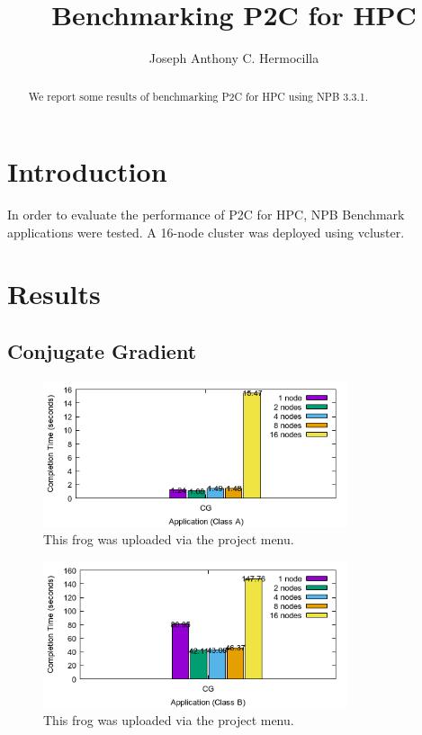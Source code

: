 \documentclass[a4paper]{article}
\title{Benchmarking P2C for HPC}
\author{Joseph Anthony C. Hermocilla}
\begin{document}
\maketitle

\begin{abstract}
We report some results of benchmarking P2C for HPC using NPB 3.3.1.
\end{abstract}

\section{Introduction}
In order to evaluate the performance of P2C for HPC, NPB Benchmark applications were tested. A 16-node cluster was deployed using vcluster.

\section{Results}

\subsection{Conjugate Gradient}

\begin{figure}[H]
\centering
\includegraphics[width=0.8\textwidth]{figures/CGvA.png}
\caption{\label{fig:CGvA}This frog was uploaded via the project menu.}
\end{figure}

\begin{figure}[H]
\centering
\includegraphics[width=0.8\textwidth]{figures/CGvB.png}
\caption{\label{fig:CGvB}This frog was uploaded via the project menu.}
\end{figure}
\end{document}
